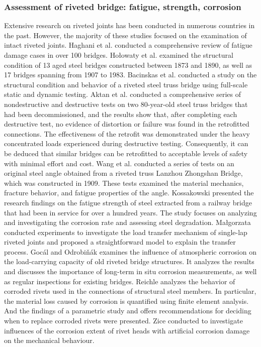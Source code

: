 \subsubsection{Assessment of riveted bridge: fatigue, strength, corrosion}
Extensive research on riveted joints has been conducted in numerous countries in the past. However, the majority of these studies focused on the examination of intact riveted joints. Haghani et al.\cite{haghani2012} conducted a comprehensive review of fatigue damage cases in over 100 bridges. Hołowaty et al. \cite{holowaty2022} examined the structural condition of 13 aged steel bridges constructed between 1873 and 1890, as well as 17 bridges spanning from 1907 to 1983.
Bacinskas et al. \cite{BACINSKAS2013136} conducted a study on the structural condition and behavior of a riveted steel truss bridge using full-scale static and dynamic testing. Aktan et al. \cite{aktan1994destructive} conducted a comprehensive series of nondestructive and destructive tests on two 80-year-old steel truss bridges that had been decommissioned, and the results show that, after completing each destructive test, no evidence of distortion or failure was found in the retrofitted connections. The effectiveness of the retrofit was demonstrated under the heavy concentrated loads experienced during destructive testing. Consequently, it can be deduced that similar bridges can be retrofitted to acceptable levels of safety with minimal effort and cost. Wang et al. \cite{wang2012} conducted a series of tests on an original steel angle obtained from a riveted truss Lanzhou Zhongshan Bridge, which was constructed in 1909. These tests examined the material mechanics, fracture behavior, and fatigue properties of the angle. Kossakowski \cite{kossakowski2013fatigue} presented the research findings on the fatigue strength of steel extracted from a railway bridge that had been in service for over a hundred years. The study focuses on analyzing and investigating the corrosion rate and assessing steel degradation. Małgorzata \cite{Skorupa2015InvestigationJoint} conducted experiments to investigate the load transfer mechanism of single-lap riveted joints and proposed a straightforward model to explain the transfer process. Gocál and Odrobiňák \cite{Gocal2020OnBridges} examines the influence of atmospheric corrosion on the load-carrying capacity of old riveted bridge structures. It analyzes the results and discusses the importance of long-term in situ corrosion measurements, as well as regular inspections for existing bridges. Reichle \cite{Reichle1999} analyzes the behavior of corroded rivets used in the connections of structural steel members. In particular, the material loss caused by corrosion is quantified using finite element analysis. And the findings of a parametric study and offers recommendations for deciding when to replace corroded rivets were presented. Zice \cite{Zice2023} conducted to investigate influences of the corrosion extent of rivet heads with artificial corrosion damage on the mechanical behaviour.

